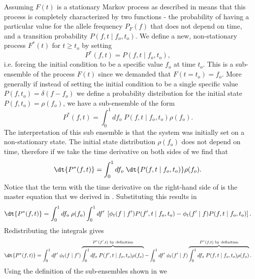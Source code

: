 Assuming $F(t)$ is a stationary Markov process as described in
 means that this process is completely
characterized by two functions - the probability of having a particular value
for the allele frequency $P_F(f)$ that does not depend on time, and a transition
probability $P(f, t \mid f_o, t_o)$. We define a new, non-stationary process
$F^*(t)$ for $t \geq t_o$ by setting
\begin{equation}
  P^*(f, t) = P(f, t\mid f_o, t_o),
\end{equation}
i.e. forcing the initial condition to be a specific value $f_o$ at time $t_o$.
This is a sub-ensemble of the process $F(t)$ since we demanded that $F(t = t_o)
= f_o$. More generally if instead of setting the initial condition to be a
single specific value $P(f, t_o) = \delta(f - f_o)$ we define a probability
distribution for the initial state $P(f, t_o) = \rho(f_o)$, we have a
sub-ensemble of the form
\begin{equation}
  P^*(f, t) = \int_0^1 df_o \; P(f, t\mid f_o, t_o) \rho(f_o).
  \label{eq_subensemble}
\end{equation}
The interpretation of this sub ensemble is that the system was initially set on
a non-stationary state. The initial state distribution $\rho(f_o)$ does not
depend on time, therefore if we take the time derivative on both sides of
 we find that
\begin{equation}
  \dt{P^*(f, t)} = \int_0^1 df_o \; \dt{P(f, t\mid f_o, t_o)}
                        \rho(f_o).
\label{eq_subensemble_dt}
\end{equation}
Notice that the term with the time derivative on the right-hand side of
 is the master equation that we derived in
. Substituting this results in
\begin{equation}
  \dt{P^*(f, t)} = \int_0^1 df_o \; \rho(f_o)
  \int_0^1 df' \;
  \left[ \phi_t(f \mid f') P(f', t \mid f_o, t_o) -
  \phi_t(f' \mid f) P(f, t \mid f_o, t_o) \right].
\end{equation}
Redistributing the integrals gives
\begin{equation}
  \dt{P^*(f, t)} = \int_0^1 df' \; \phi_t(f \mid f')
  \overbrace{
  \int_0^1 df_o \; P(f', t \mid f_o, t_o) \rho(f_o)}
  ^{P^*(f', t)\text{ by definition}} -
  \int_0^1 df' \; \phi_t(f' \mid f)
  \overbrace{
  \int_0^1 df_o \; P(f, t \mid f_o, t_o) \rho(f_o)}
  ^{P^*(f, t)\text{ by definition}}.
\end{equation}
Using the definition of the sub-ensembles shown in  we
